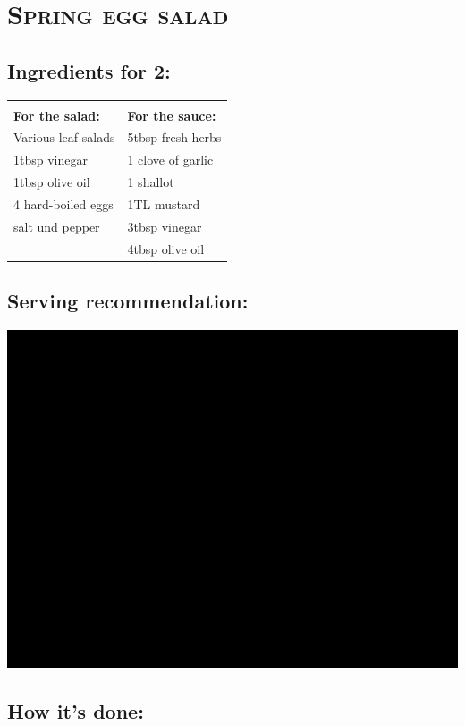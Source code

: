 \section{\textsc{Spring egg salad}}

\subsection*{Ingredients for 2:}

\begin{tabular}{p{7.5cm} p{7.5cm}}
	& \\
	\textbf{For the salad:} & \textbf{For the sauce:} \\
	Various leaf salads & 5tbsp fresh herbs \\
	1tbsp vinegar & 1 clove of garlic \\
	1tbsp olive oil & 1 shallot \\
	4 hard-boiled eggs & 1TL mustard \\
	salt und pepper & 3tbsp vinegar \\
	& 4tbsp olive oil
\end{tabular}

\subsection*{Serving recommendation:}

\includegraphics[width=\textwidth]{img/ph.jpg} \cite{fruehlingeiersalat}

\subsection*{How it's done:}

